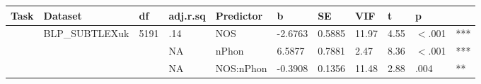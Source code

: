 \begin{table}[ht]
\centering
\begingroup\normalsize
\begin{tabular}{lllllllllll}
  \hline
Task & Dataset & df & adj.r.sq & Predictor & b & SE & VIF & t & p &  \\ 
  \hline
 & BLP\_SUBTLEXuk & 5191 & .14 & NOS & -2.6763 & 0.5885 & 11.97 & 4.55 & $<$.001 & *** \\ 
   &  &  & NA & nPhon & 6.5877 & 0.7881 & 2.47 & 8.36 & $<$.001 & *** \\ 
   &  &  & NA & NOS:nPhon & -0.3908 & 0.1356 & 11.48 & 2.88 & .004 & ** \\ 
   \hline
\end{tabular}
\endgroup
\end{table}
